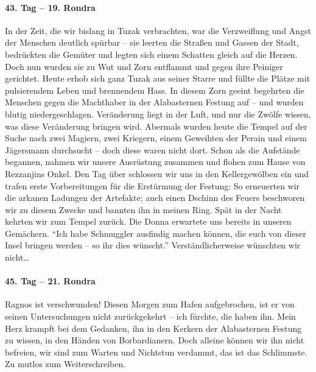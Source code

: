 \paragraph{43. Tag -- 19. Rondra}
In der Zeit, die wir bislang in Tuzak verbrachten, war die Verzweiflung und Angst der Menschen deutlich spürbar -- sie leerten die Straßen und Gassen der Stadt, bedrückten die Gemüter und legten sich einem Schatten gleich auf die Herzen. Doch nun wurden sie zu Wut und Zorn entflammt und gegen ihre Peiniger gerichtet. Heute erhob sich ganz Tuzak aus seiner Starre und füllte die Plätze mit pulsierendem Leben und brennendem Hass. In diesem Zorn geeint begehrten die Menschen gegen die Machthaber in der Alabasternen Festung auf -- und wurden blutig niedergeschlagen. Veränderung liegt in der Luft, und nur die Zwölfe wissen, was diese Veränderung bringen wird. Abermals wurden heute die Tempel auf der Suche nach zwei Magiern, zwei Kriegern, einem Geweihten der Perain und einem Jägersmann durchsucht -- doch diese waren nicht dort. Schon als die Aufstände begannen, nahmen wir unsere Ausrüstung zusammen und flohen zum Hause von Rezzanjins Onkel. Den Tag über schlossen wir uns in den Kellergewölben ein und trafen erste Vorbereitungen für die Erstürmung der Festung: So erneuerten wir die arkanen Ladungen der Artefakte; auch einen Dschinn des Feuers beschworen wir zu diesem Zwecke und bannten ihn in meinen Ring. Spät in der Nacht kehrten wir zum Tempel zurück. Die Donna erwartete uns bereits in unseren Gemächern. ``Ich habe Schmuggler ausfindig machen können, die euch von dieser Insel bringen werden -- so ihr dies wünscht.'' Verständlicherweise wünschten wir nicht\dots

\paragraph{45. Tag -- 21. Rondra}

Ragnos ist verschwunden! Diesen Morgen zum Hafen aufgebrochen, ist er von seinen Untersuchungen nicht zurückgekehrt -- ich fürchte, die haben ihn. Mein Herz krampft bei dem Gedanken, ihn in den Kerkern der Alabasternen Festung zu wissen, in den Händen von Borbardianern. Doch alleine können wir ihn nicht befreien, wir sind zum Warten und Nichtstun verdammt, das ist das Schlimmste. Zu mutlos zum Weiterschreiben.

